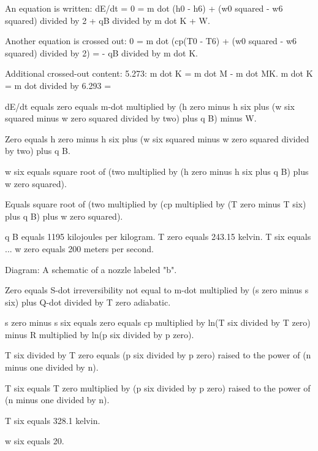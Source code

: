 An equation is written:  
dE/dt = 0 = m dot (h0 - h6) + (w0 squared - w6 squared) divided by 2 + qB divided by m dot K + W.  

Another equation is crossed out:  
0 = m dot (cp(T0 - T6) + (w0 squared - w6 squared) divided by 2) = - qB divided by m dot K.  

Additional crossed-out content:  
5.273: m dot K = m dot M - m dot MK.  
m dot K = m dot divided by 6.293 =

dE/dt equals zero equals m-dot multiplied by (h zero minus h six plus (w six squared minus w zero squared divided by two) plus q B) minus W.  

Zero equals h zero minus h six plus (w six squared minus w zero squared divided by two) plus q B.  

w six equals square root of (two multiplied by (h zero minus h six plus q B) plus w zero squared).  

Equals square root of (two multiplied by (cp multiplied by (T zero minus T six) plus q B) plus w zero squared).  

q B equals 1195 kilojoules per kilogram.  
T zero equals 243.15 kelvin.  
T six equals ...  
w zero equals 200 meters per second.  

Diagram: A schematic of a nozzle labeled "b".  

Zero equals S-dot irreversibility not equal to m-dot multiplied by (s zero minus s six) plus Q-dot divided by T zero adiabatic.  

s zero minus s six equals zero equals cp multiplied by ln(T six divided by T zero) minus R multiplied by ln(p six divided by p zero).  

T six divided by T zero equals (p six divided by p zero) raised to the power of (n minus one divided by n).  

T six equals T zero multiplied by (p six divided by p zero) raised to the power of (n minus one divided by n).  

T six equals 328.1 kelvin.  

w six equals 20.